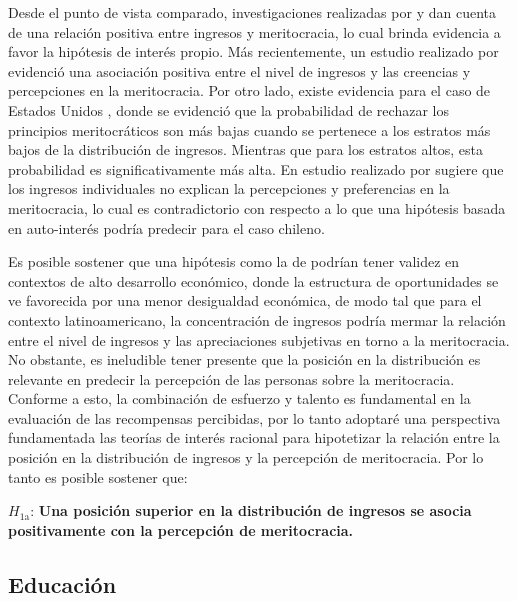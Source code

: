 \documentclass[12pt]{article}
\begin{document}
Desde el punto de vista comparado, investigaciones realizadas por \citet{Duru-bellat2012} y \cite{Kunovich2007} dan cuenta de una relación positiva entre ingresos y meritocracia, lo cual brinda evidencia a favor la hipótesis de interés propio. Más recientemente, un estudio realizado por \citet{Sandoval2017} evidenció una asociación positiva entre el nivel de ingresos y las creencias y percepciones en la meritocracia. Por otro lado, existe evidencia para el caso de Estados Unidos \citep{Newman2015, Solt2016}, donde se evidenció que la probabilidad de rechazar los principios meritocráticos son más bajas cuando se pertenece a los estratos más bajos de la distribución de ingresos. Mientras que para los estratos altos, esta probabilidad es significativamente más alta. En estudio realizado por \citet{Castillo2018} sugiere que los ingresos individuales no explican la percepciones y preferencias en la meritocracia, lo cual es contradictorio con respecto a lo que una hipótesis basada en auto-interés podría predecir para el caso chileno. 

Es posible sostener que una hipótesis como la de \cite{Meltzer1981} podrían tener validez en contextos de alto desarrollo económico, donde la estructura de oportunidades se ve favorecida por una menor desigualdad económica, de modo tal que para el contexto latinoamericano, la concentración de ingresos podría mermar la relación entre el nivel de ingresos y las apreciaciones subjetivas en torno a la meritocracia. No obstante, es ineludible tener presente que la posición en la distribución es relevante en predecir la percepción de las personas sobre la meritocracia. Conforme a esto, la combinación de esfuerzo y talento es fundamental en la evaluación de las recompensas percibidas, por lo tanto adoptaré una perspectiva fundamentada las teorías de interés racional para hipotetizar la relación entre la posición en la distribución de ingresos y la percepción de meritocracia. Por lo tanto es posible sostener que: 

$H_{\text{1a}}$: \textbf{Una posición superior en la distribución de ingresos se asocia positivamente con la percepción de meritocracia.} 

\subsection*{Educación}
\end{document}

